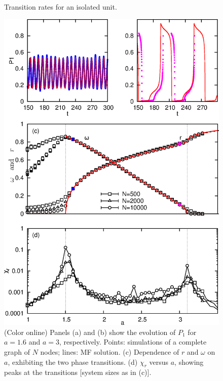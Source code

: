 \begin{figure}[!b]
\begin{center}
\caption{\label{fig:taxas}
    Transition rates for an isolated unit.
    }
\end{center}
\end{figure}

\begin{figure}
    \includegraphics[height=.75\textheight]{fig/chap2/figure2.eps}
\begin{center}
\caption{\label{complete_graph} (Color online) Panels (a) and (b) show the evolution of $P_1$ for $a=1.6$ and $a=3$, respectively.
Points: simulations of a complete graph of $N$ nodes; lines: MF solution. (c) Dependence of $r$ and $\omega$ on $a$, exhibiting the two
phase transitions. (d) $\chi_r$ versus $a$, showing peaks at the transitions [system sizes as in (c)].  }
\end{center}
\end{figure}

